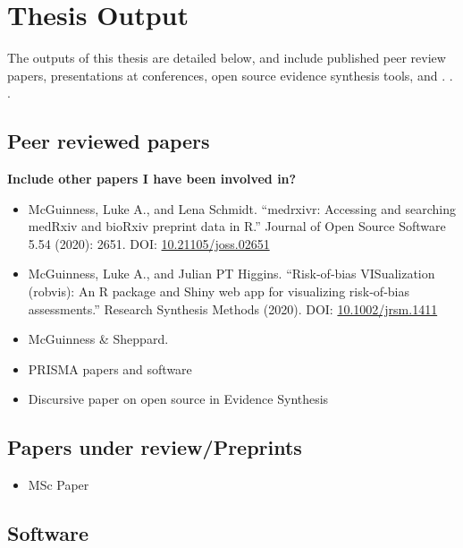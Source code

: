 \documentclass[a4paper, twoside]{templates/ociamthesis}
\providecommand{\tightlist}{%
  \setlength{\itemsep}{0pt}\setlength{\parskip}{0pt}}
\begin{document}
\hypertarget{thesis-output}{%
\section{Thesis Output}\label{thesis-output}}

The outputs of this thesis are detailed below, and include published peer review papers, presentations at conferences, open source evidence synthesis tools, and . . .

\hypertarget{peer-reviewed-papers}{%
\subsection{Peer reviewed papers}\label{peer-reviewed-papers}}

\textbf{Include other papers I have been involved in?}

\begin{itemize}
\item
  McGuinness, Luke A., and Lena Schmidt. ``medrxivr: Accessing and searching medRxiv and bioRxiv preprint data in R.'' Journal of Open Source Software 5.54 (2020): 2651. DOI: \href{https://doi.org/10.21105/joss.02651}{10.21105/joss.02651}
\item
  McGuinness, Luke A., and Julian PT Higgins. ``Risk‐of‐bias VISualization (robvis): An R package and Shiny web app for visualizing risk‐of‐bias assessments.'' Research Synthesis Methods (2020). DOI: \href{https://doi.org/10.1002/jrsm.1411}{10.1002/jrsm.1411}
\item
  McGuinness \& Sheppard.
\item
  PRISMA papers and software
\item
  Discursive paper on open source in Evidence Synthesis
\end{itemize}

\hypertarget{papers-under-reviewpreprints}{%
\subsection{Papers under review/Preprints}\label{papers-under-reviewpreprints}}

\begin{itemize}
\tightlist
\item
  MSc Paper
\end{itemize}

\hypertarget{software}{%
\subsection{Software}\label{software}}
\end{document}
